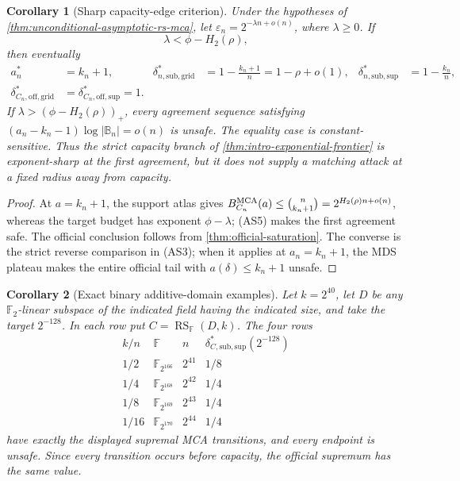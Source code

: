 \documentclass[11pt,a4paper]{amsart}
\numberwithin{equation}{section}
\newtheorem{corollary}[corollary]{Corollary}
\theoremstyle{remark}
\DeclareMathOperator{\RS}{RS}
\newcommand{\F}{\mathbb F}
\newcommand{\B}{\mathbb B}
\newcommand{\eps}{\varepsilon}
\newcommand{\abs}[1]{\lvert #1\rvert}
\begin{document}
\begin{corollary}[Sharp capacity-edge criterion]
\label{cor:unconditional-rs-mca-capacity}
Under the hypotheses of
\cref{thm:unconditional-asymptotic-rs-mca}, let
\(\eps_n=2^{-\lambda n+o(n)}\), where \(\lambda\ge0\).
If
\[
                         \lambda<\phi-H_2(\rho),   \tag{AS5}
\]
then eventually
\[
 \begin{aligned}
 a_n^*&=k_n+1,&
 \delta_{n,\mathrm{sub,grid}}^*&=1-\frac{k_n+1}{n}
       =1-\rho+o(1),&
 \delta_{n,\mathrm{sub,sup}}^*&=1-\frac{k_n}{n},\\
 \delta_{C_n,\mathrm{off,grid}}^*
 &=\delta_{C_n,\mathrm{off,sup}}^*=1.&&&
 \end{aligned}                                    \tag{AS6}
\]
If \(\lambda>(\phi-H_2(\rho))_+\), every agreement sequence satisfying
\((a_n-k_n-1)\log\abs{\B_n}=o(n)\) is unsafe.  The equality case is
constant-sensitive.  Thus the strict capacity branch of
\cref{thm:intro-exponential-frontier} is exponent-sharp at the first
agreement, but it does not supply a matching attack at a fixed radius
away from capacity.
\end{corollary}

\begin{proof}
At \(a=k_n+1\), the support atlas gives
\(B_{C_n}^{\rm MCA}(a)\le\binom n{k_n+1}
=2^{H_2(\rho)n+o(n)}\), whereas the target budget has exponent
\(\phi-\lambda\); \textup{(AS5)} makes the first agreement safe.
The official conclusion follows from \cref{thm:official-saturation}.
The converse is the strict reverse comparison in \textup{(AS3)}; when it
applies at \(a_n=k_n+1\), the MDS plateau makes the entire official tail
with \(a(\delta)\le k_n+1\) unsafe.
\end{proof}

\begin{corollary}[Exact binary additive-domain examples]
\label{cor:binary-additive-examples}
Let \(k=2^{40}\), let \(D\) be any \(\F_2\)-linear subspace of the
indicated field having the indicated size, and take the target
\(2^{-128}\).  In each row put \(C=\RS_{\F}(D,k)\).  The four rows
\[
\begin{array}{c|c|c|c}
 k/n&\F&n&\delta_{C,\mathrm{sub,sup}}^*(2^{-128})\\ \hline
 1/2&\F_{2^{166}}&2^{41}&1/8\\
 1/4&\F_{2^{168}}&2^{42}&1/4\\
 1/8&\F_{2^{169}}&2^{43}&1/4\\
 1/16&\F_{2^{170}}&2^{44}&1/4
\end{array}
\]
have exactly the displayed supremal MCA transitions, and every endpoint
is unsafe.  Since every transition occurs before capacity, the official
supremum has the same value.
\end{corollary}
\end{document}
